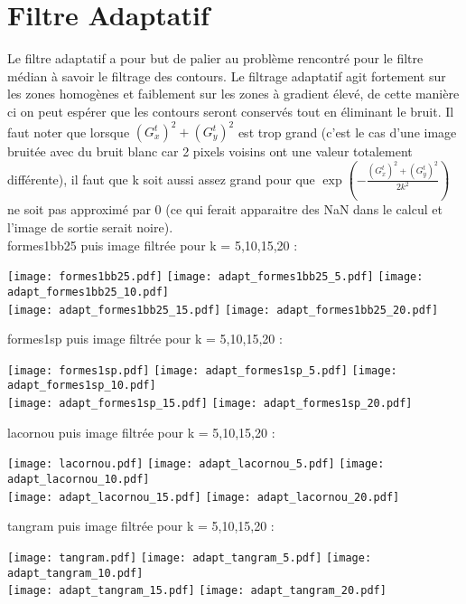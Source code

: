 \documentclass[12pt]{article}
\numberwithin{equation}{section}
\begin{document}
\section{Filtre Adaptatif}
Le filtre adaptatif a pour but de palier au problème rencontré pour le filtre médian à savoir le filtrage des contours. Le filtrage adaptatif agit fortement sur les zones homogènes et faiblement sur les zones à gradient élevé, de cette manière ci on peut espérer que les contours seront conservés tout en éliminant le bruit. Il faut noter que lorsque $(G_x^t)^2 + (G_y^t)^2$ est trop grand (c'est le cas d'une image bruitée avec du bruit blanc car 2 pixels voisins ont une valeur totalement différente), il faut que k soit aussi assez grand pour que $\exp(-\frac{(G_x^t)^2 + (G_y^t)^2}{2k^2})$ ne soit pas approximé par 0 (ce qui ferait apparaitre des NaN dans le calcul et l'image de sortie serait noire). \\
formes1bb25 puis image filtrée pour k = 5,10,15,20 :\\
\begin{center}
\texttt{[image: formes1bb25.pdf]}
\texttt{[image: adapt\_formes1bb25\_5.pdf]}
\texttt{[image: adapt\_formes1bb25\_10.pdf]}\\
\texttt{[image: adapt\_formes1bb25\_15.pdf]}
\texttt{[image: adapt\_formes1bb25\_20.pdf]}
\end{center}
formes1sp puis image filtrée pour k = 5,10,15,20 :\\
\begin{center}
\texttt{[image: formes1sp.pdf]}
\texttt{[image: adapt\_formes1sp\_5.pdf]}
\texttt{[image: adapt\_formes1sp\_10.pdf]}\\
\texttt{[image: adapt\_formes1sp\_15.pdf]}
\texttt{[image: adapt\_formes1sp\_20.pdf]}
\end{center}
lacornou puis image filtrée pour k = 5,10,15,20 :\\
\begin{center}
\texttt{[image: lacornou.pdf]}
\texttt{[image: adapt\_lacornou\_5.pdf]}
\texttt{[image: adapt\_lacornou\_10.pdf]}\\
\texttt{[image: adapt\_lacornou\_15.pdf]}
\texttt{[image: adapt\_lacornou\_20.pdf]}
\end{center}
tangram puis image filtrée pour k = 5,10,15,20 :\\
\begin{center}
\texttt{[image: tangram.pdf]}
\texttt{[image: adapt\_tangram\_5.pdf]}
\texttt{[image: adapt\_tangram\_10.pdf]}\\
\texttt{[image: adapt\_tangram\_15.pdf]}
\texttt{[image: adapt\_tangram\_20.pdf]}
\end{center}
\end{document}
